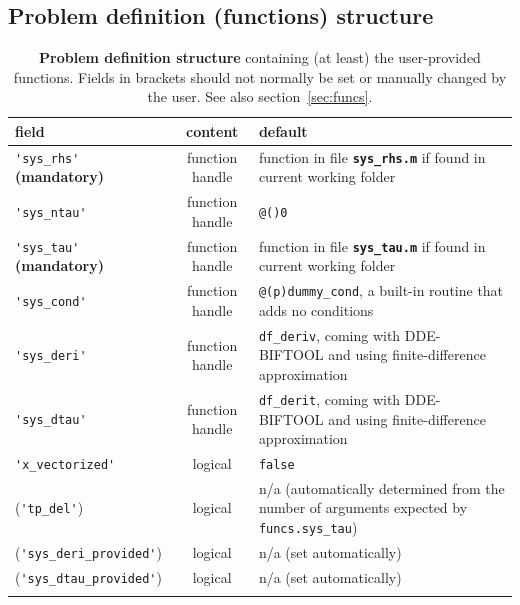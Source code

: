 \documentclass[10pt]{scrartcl}
\newcommand{\DDEBIFCODE}{\textsc{DDE-BIFTOOL}}
\newcommand{\file}[1]{\textbf{\texttt{#1}}}
\newcommand{\blist}[1]{\mbox{\lstinline!#1!}}
\begin{document}
\subsection{Problem definition (functions) structure}
\label{sec:funcs:struct}
\begin{table}[htbp]
  \centering
  \begin{tabular}[t]{l@{\hspace*{1ex}}c@{\hspace*{3ex}}p{}}
      \hline\noalign{\smallskip}
      field     & content &  default   \\\hline\noalign{\smallskip}
      \blist{'sys_rhs'} \textbf{\textsf{(mandatory)}} & function handle &  function in file \file{sys\_rhs.m} if found in 
      current working folder \\[1ex]
      \blist{'sys_ntau'} & function handle &  \blist{@()0} \\[1ex]
      \blist{'sys_tau'} \textbf{\textsf{(mandatory)}} & function handle &  function in file 
      \file{sys\_tau.m} if found in current working folder\\[1ex]
      \blist{'sys_cond'} & function handle & \blist{@(p)dummy_cond}, a built-in routine that adds no conditions\\[1ex]
      \blist{'sys_deri'} & function handle & \blist{df_deriv}, coming with 
      \DDEBIFCODE{} and using finite-difference approximation\\[1ex]
      \blist{'sys_dtau'} & function handle &  \blist{df_derit}, coming with 
      \DDEBIFCODE{} and using finite-difference approximation\\[1ex]
      \blist{'x_vectorized'} & logical &  \blist{false}\\[1ex]
      (\blist{'tp_del'}) & logical & n/a (automatically
      determined from the number of arguments expected by \blist{funcs.sys_tau})\\[1ex]
      (\blist{'sys_deri_provided'}) & logical & n/a (set automatically)\\[1ex]
      (\blist{'sys_dtau_provided'}) & logical & n/a (set automatically)
      \\\noalign{\smallskip}\hline
  \end{tabular}
  \caption{\textbf{\textsf{Problem definition structure}} containing (at least) 
    the user-provided functions. 
    Fields in brackets should not normally be set or manually changed by the user. See also section~\ref{sec:funcs}.}
  \label{tab:funcs}
\end{table}
\end{document}
